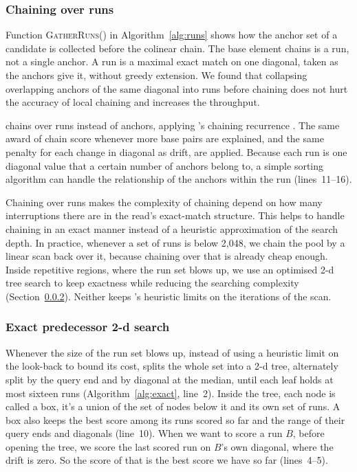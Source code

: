 \subsubsection{Chaining over runs}
\label{sec:runs}

Function \textsc{GatherRuns}() in Algorithm~\ref{alg:runs} shows how the anchor set of a candidate is collected before the colinear chain. The base element \flash{} chains is a run, not a single anchor. A run is a maximal exact match on one diagonal, taken as the anchors give it, without greedy extension. We found that collapsing overlapping anchors of the same diagonal into runs before chaining does not hurt the accuracy of local chaining and increases the throughput.

\flash{} chains over runs instead of anchors, applying \mmtwo{}'s chaining recurrence \citep[Section~2.1]{li2018minimap2}. The same award of chain score whenever more base pairs are explained, and the same penalty for each change in diagonal as drift, are applied. Because each run is one diagonal value that a certain number of anchors belong to, a simple sorting algorithm can handle the relationship of the anchors within the run (lines~11--16).

Chaining over runs makes the complexity of chaining depend on how many interruptions there are in the read's exact-match structure. This helps \flash{} to handle chaining in an exact manner instead of a heuristic approximation of the search depth. In practice, whenever a set of runs is below 2,048, we chain the pool by a linear scan back over it, because chaining over that is already cheap enough. Inside repetitive regions, where the run set blows up, we use an optimised 2-d tree search to keep exactness while reducing the searching complexity (Section~\ref{sec:laddersearch}). Neither keeps \mmtwo{}'s heuristic limits on the iterations of the scan.

\subsubsection{Exact predecessor 2-d search}
\label{sec:laddersearch}

Whenever the size of the run set blows up, instead of using a heuristic limit on the look-back to bound its cost, \flash{} splits the whole set into a 2-d tree, alternately split by the query end and by diagonal at the median, until each leaf holds at most sixteen runs (Algorithm~\ref{alg:exact}, line~2). Inside the tree, each node is called a box, it's a union of the set of nodes below it and its own set of runs. A box also keeps the best score among its runs scored so far and the range of their query ends and diagonals (line~10). When we want to score a run $B$, before opening the tree, we score the last scored run on $B$'s own diagonal, where the drift is zero. So the score of that is the best score we have so far (lines~4--5).

